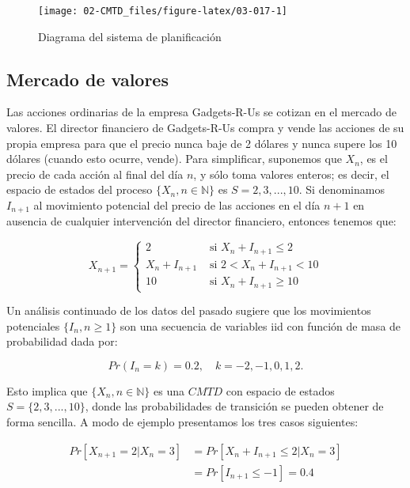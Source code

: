 \documentclass[
]{book}
\theoremstyle{definition}
\theoremstyle{definition}
\theoremstyle{definition}
\theoremstyle{definition}
\theoremstyle{remark}
\begin{document}
\begin{figure}

{\centering \texttt{[image: 02-CMTD\_files/figure-latex/03-017-1]} 

}

\caption{Diagrama del sistema de planificación}\label{fig:03-017}
\end{figure}

\hypertarget{mercadovalores}{%
\subsection{Mercado de valores}\label{mercadovalores}}

Las acciones ordinarias de la empresa Gadgets-R-Us se cotizan en el mercado de valores. El director financiero de Gadgets-R-Us compra y vende las acciones de su propia empresa para que el precio nunca baje de 2 dólares y nunca supere los 10 dólares (cuando esto ocurre, vende). Para simplificar, suponemos que \(X_n\), es el precio de cada acción al final del día \(n\), y sólo toma valores enteros; es decir, el espacio de estados del proceso \(\{X_n, n \in \mathbb{N}\}\) es \(S = 2, 3,...,10\). Si denominamos \(I_{n+1}\) al movimiento potencial del precio de las acciones en el día \(n+1\) en ausencia de cualquier intervención del director financiero, entonces tenemos que:

\begin{equation*}
X_{n+1} =  
\begin{cases}
2 & \text{ si } X_n + I_{n+1} \leq 2\\
X_n + I_{n+1} & \text{ si } 2 < X_n + I_{n+1} < 10\\
10 & \text{ si }  X_n + I_{n+1} \geq 10
\end{cases}
\end{equation*}

Un análisis continuado de los datos del pasado sugiere que los movimientos potenciales \(\{I_n, n \geq 1\}\) son una secuencia de variables iid con función de masa de probabilidad dada por:

\[Pr(I_n = k) = 0.2, \quad k = -2, -1, 0, 1, 2.\]

Esto implica que \(\{X_n, n \in \mathbb{N}\}\) es una \(CMTD\) con espacio de estados \(S = \{2, 3,...,10\}\), donde las probabilidades de transición se pueden obtener de forma sencilla. A modo de ejemplo presentamos los tres casos siguientes:

\[\begin{array}{ll}
Pr[X_{n+1} = 2 | X_n = 3] & = Pr[X_n + I_{n+1} \leq 2 | X_n = 3]\\
& = Pr[I_{n+1} \leq -1]= 0.4
\end{array}\]
\end{document}
